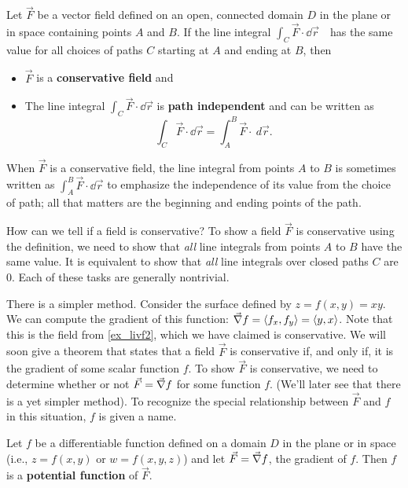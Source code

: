 \begin{definition}\label{def:conservative}%
Let $\vec F$ be a vector field defined on an open, connected domain $D$ in the plane or in space containing points $A$ and $B$. If the line integral
$\int_C \vec F\cdot\dd\vec r$\ \ has the same value for all choices of paths $C$ starting at $A$ and ending at $B$, then
\begin{itemize}
	\item $\vec F$ is a \textbf{conservative field} and
	\item	The line integral $\int_C \vec F\cdot\dd\vec r$ is \textbf{path independent} and can be written as
	\[\int_C \vec F\cdot\dd\vec r = \int_A^B \vec F\cdot \ d\vec r.\] 
\end{itemize}
\end{definition}

When $\vec F$ is a conservative field, the line integral from points $A$ to $B$ is sometimes written as $\int_A^B\vec F\cdot\dd\vec r$ to emphasize the independence of its value from the choice of path; all that matters are the beginning and ending points of the path.

How can we tell if a field is conservative? To show a field $\vec F$ is conservative using the definition, we need to show that \emph{all} line integrals from points $A$ to $B$ have the same value. It is equivalent to show that \emph{all} line integrals over closed paths $C$ are 0. Each of these tasks are generally nontrivial.

There is a simpler method. Consider the surface defined by $z = f(x,y) = xy$. We can compute the gradient of this function: $\vec\nabla f =\left\langle f_x, f_y\right\rangle=\left\langle y, x\right\rangle$. Note that this is the field from \autoref{ex_livf2}, which we have claimed is conservative. We will soon give a theorem that states that a field $\vec F$ is conservative if, and only if, it is the gradient of some scalar function $f$. To show $\vec F$ is conservative, we need to determine whether or not $\vec F = \vec\nabla f$ for some function $f$. (We'll later see that there is a yet simpler method). To recognize the special relationship between $\vec F$ and $f$ in this situation, $f$ is given a name.

\begin{definition}\label{def:potential}%
Let $f$ be a differentiable function defined on a  domain $D$ in the plane or in space (i.e., $z = f(x,y)$ or $w = f(x,y,z)$) and let $\vec F = \vec\nabla f$, the gradient of $f$. Then $f$ is a \textbf{potential function} of $\vec F$.
\end{definition}

